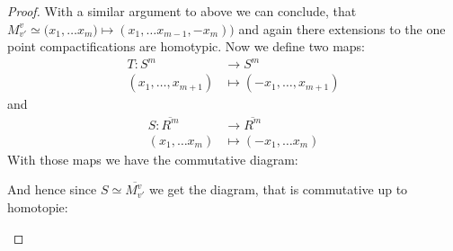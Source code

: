 \begin{proof}
    With a similar argument to above we can conclude, that $M^v_{v'}\simeq \Big(x_1,\dots x_m)\mapsto (x_1,\dots x_{m-1},-x_m)\big)$ and again there extensions to the one point compactifications are homotypic.
    Now we define two maps: 
    \begin{align*}
        T: S^m &\to S^m \\
        (x_1,\dots,x_{m+1})&  \mapsto (-x_1,\dots,x_{m+1})
    \end{align*}
    and
    \begin{align*}
        S:\overline{R^m} & \to \overline{R^m} \\
        (x_1,\dots x_m)  &\mapsto (-x_1,\dots x_m)
    \end{align*}
    With those maps we have the commutative diagram: 
    \begin{center}
    \end{center}
    And hence since $S\simeq \overline{M^v_{v'}}$ we get the diagram, that is commutative up to homotopie:
\begin{center}
\end{center}

\end{proof}
